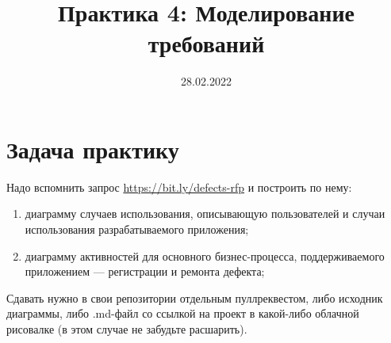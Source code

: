 \documentclass[a5paper]{article}
\title{Практика 4: Моделирование требований}
\date{28.02.2022}
\begin{document}
\maketitle
\thispagestyle{empty}

\section{Задача практику}

Надо вспомнить запрос \url{https://bit.ly/defects-rfp} и построить по нему:

\begin{enumerate}
    \item диаграмму случаев использования, описывающую пользователей и случаи использования разрабатываемого приложения;
    \item диаграмму активностей для основного бизнес-процесса, поддерживаемого приложением --- регистрации и ремонта дефекта;
\end{enumerate}

Сдавать нужно в свои репозитории отдельным пуллреквестом, либо исходник диаграммы, либо .md-файл со ссылкой на проект в какой-либо облачной рисовалке (в этом случае не забудьте расшарить).
\end{document}
